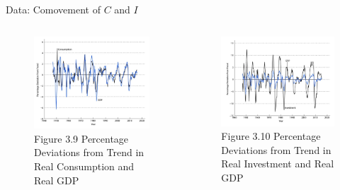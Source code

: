 \documentclass[11pt,aspectratio=169,usenames,dvipsnames]{beamer}
\begin{document}
\begin{frame}{Data: Comovement of $ C $ and $ I $}
\label{slide:Data__Comovement_of___C___and___I__}

\begin{columns}
    \begin{column}{0.5\textwidth}
        \begin{figure}
            \caption{Figure 3.9 Percentage Deviations from Trend in \alert{Real Consumption} and Real GDP}
            \includegraphics[width=\textwidth]{./figures/Figure3_9.jpg}
        \end{figure}
    \end{column}
    \begin{column}{0.5\textwidth}
        \begin{figure}
            \caption{Figure 3.10 Percentage Deviations from Trend in \alert{Real Investment} and Real GDP}
            \includegraphics[width=\textwidth]{./figures/Figure3_10.jpg}
        \end{figure}
    \end{column}
\end{columns}
\end{frame}
\end{document}
